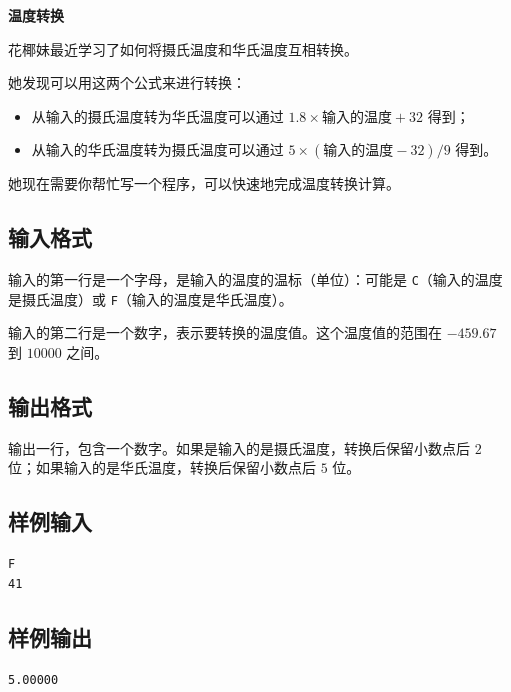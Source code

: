 \documentclass{article}
\newcommand{\problemname}[1]{\begin{center}\Large\bfseries #1\end{center}}
\begin{document}
\problemname{温度转换}

花椰妹最近学习了如何将摄氏温度和华氏温度互相转换。

她发现可以用这两个公式来进行转换：

\begin{itemize}
  \item 从输入的摄氏温度转为华氏温度可以通过 $1.8\times\text{输入的温度}+32$ 得到；

  \item 从输入的华氏温度转为摄氏温度可以通过 $5\times(\text{输入的温度}-32)/9$ 得到。

\end{itemize}
她现在需要你帮忙写一个程序，可以快速地完成温度转换计算。

\subsection*{输入格式}
输入的第一行是一个字母，是输入的温度的温标（单位）：可能是 \texttt{C}（输入的温度是摄氏温度）或 \texttt{F}（输入的温度是华氏温度）。

输入的第二行是一个数字，表示要转换的温度值。这个温度值的范围在 $-459.67$ 到 $10000$ 之间。

\subsection*{输出格式}
输出一行，包含一个数字。如果是输入的是摄氏温度，转换后保留小数点后 $2$ 位；如果输入的是华氏温度，转换后保留小数点后 $5$ 位。

\subsection*{样例输入}
\begin{verbatim}
F
41
\end{verbatim}

\subsection*{样例输出}
\begin{verbatim}
5.00000
\end{verbatim}
\end{document}

